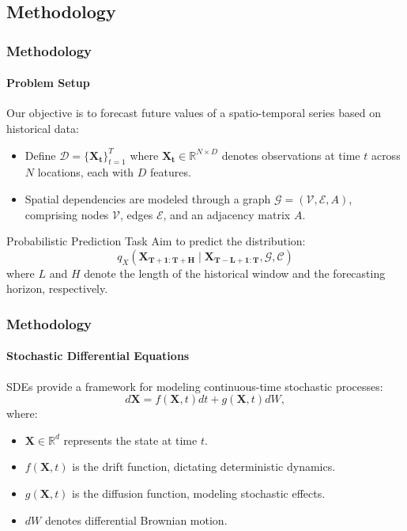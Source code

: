 \documentclass[light]{lutbeamer} %
\begin{document}
\subsection{Methodology}
\begin{frame}
    \frametitle{Methodology}
    \framesubtitle{Problem Setup}

    Our objective is to forecast future values of a spatio-temporal series based on historical data:
    \begin{itemize}
        \item Define \(\mathcal{D} = \{\mathbf{X_t}\}_{t=1}^T\) where \(\mathbf{X_t} \in \mathbb{R}^{N \times D}\) denotes observations at time \(t\) across \(N\) locations, each with \(D\) features.
        \item Spatial dependencies are modeled through a graph \(\mathcal{G} = (\mathcal{V}, \mathcal{E}, A)\), comprising nodes \(\mathcal{V}\), edges \(\mathcal{E}\), and an adjacency matrix \(A\).
    \end{itemize}
    \vspace{-0.65em}
    \begin{block}{Probabilistic Prediction Task}
        Aim to predict the distribution:
        \[
            q_X (\mathbf{X_{T+1:T+H}} \mid \mathbf{X_{T-L+1:T}}, \mathcal{G}, \mathcal{C})
        \]
        where \(L\) and \(H\) denote the length of the historical window and the forecasting horizon, respectively.
    \end{block}
\end{frame}


\begin{frame}
    \frametitle{Methodology}
    \framesubtitle{Stochastic Differential Equations}

    SDEs provide a framework for modeling continuous-time stochastic processes:
    \begin{equation}
        d\mathbf{X} = f(\mathbf{X}, t)dt + g(\mathbf{X}, t)dW,
    \end{equation}
    where:
    \begin{itemize}
        \item \(\mathbf{X} \in \mathbb{R}^d\) represents the state at time \(t\).
        \item \(f(\mathbf{X}, t)\) is the drift function, dictating deterministic dynamics.
        \item \(g(\mathbf{X}, t)\) is the diffusion function, modeling stochastic effects.
        \item \(dW\) denotes differential Brownian motion.
    \end{itemize}
\end{frame}
\end{document}

